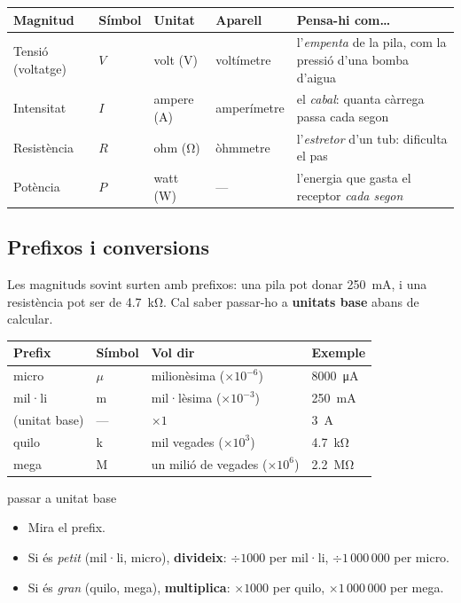 \renewcommand{\arraystretch}{1.5}
\begin{center}
\begin{tabular}{@{}llllp{5.6cm}@{}}
\toprule
\textbf{Magnitud} & \textbf{Símbol} & \textbf{Unitat} & \textbf{Aparell} & \textbf{Pensa-hi com\ldots}\\
\midrule
Tensió (voltatge) & $V$ & volt (\si{\volt}) & voltímetre & l'\emph{empenta} de la pila, com la pressió d'una bomba d'aigua\\
Intensitat & $I$ & ampere (\si{\ampere}) & amperímetre & el \emph{cabal}: quanta càrrega passa cada segon\\
Resistència & $R$ & ohm (\si{\ohm}) & òhmmetre & l'\emph{estretor} d'un tub: dificulta el pas\\
Potència & $P$ & watt (\si{\watt}) & --- & l'energia que gasta el receptor \emph{cada segon}\\
\bottomrule
\end{tabular}
\end{center}

\subsection{Prefixos i conversions}

Les magnituds sovint surten amb prefixos: una pila pot donar \SI{250}{\milli\ampere}, i una resistència pot ser de \SI{4,7}{\kilo\ohm}. Cal saber passar-ho a \textbf{unitats base} abans de calcular.

\begin{center}
\renewcommand{\arraystretch}{1.4}
\begin{tabular}{@{}llll@{}}
\toprule
\textbf{Prefix} & \textbf{Símbol} & \textbf{Vol dir} & \textbf{Exemple}\\
\midrule
micro & $\mu$ & milionèsima ($\times 10^{-6}$) & \SI{8000}{\micro\ampere}\\
mil·li & m & mil·lèsima ($\times 10^{-3}$) & \SI{250}{\milli\ampere}\\
(unitat base) & --- & $\times 1$ & \SI{3}{\ampere}\\
quilo & k & mil vegades ($\times 10^3$) & \SI{4,7}{\kilo\ohm}\\
mega & M & un milió de vegades ($\times  10^6 $) & \SI{2,2}{\mega\ohm}\\
\bottomrule
\end{tabular}
\end{center}

\begin{metode}{passar a unitat base}
\begin{itemize}
 \item \textbf{} Mira el prefix. 
 \item \textbf{} Si és \emph{petit} (mil·li, micro), \textbf{divideix}: $\div 1000$ per mil·li, $\div 1\,000\,000$ per micro.\quad
 \item \textbf{} Si és \emph{gran} (quilo, mega), \textbf{multiplica}: $\times 1000$ per quilo, $\times 1\,000\,000$ per mega.
\end{itemize}
\end{metode}

